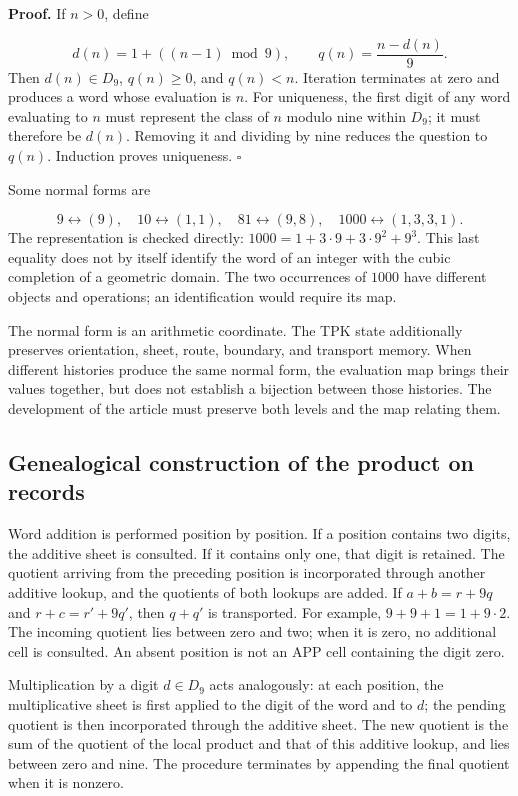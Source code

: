 \textbf{Proof.} If $n>0$, define

\[
d(n)=1+((n-1)\bmod9),\qquad q(n)=\frac{n-d(n)}9.
\]
Then $d(n)\in D_9$, $q(n)\ge0$, and $q(n)<n$. Iteration terminates at zero and produces a word whose evaluation is $n$. For uniqueness, the first digit of any word evaluating to $n$ must represent the class of $n$ modulo nine within $D_9$; it must therefore be $d(n)$. Removing it and dividing by nine reduces the question to $q(n)$. Induction proves uniqueness. \hfill\(\square\)

Some normal forms are

\[
9\leftrightarrow(9),\quad
10\leftrightarrow(1,1),\quad
81\leftrightarrow(9,8),\quad
1000\leftrightarrow(1,3,3,1).
\]
The representation is checked directly: $1000=1+3\cdot9+3\cdot9^2+9^3$. This last equality does not by itself identify the word of an integer with the cubic completion of a geometric domain. The two occurrences of $1000$ have different objects and operations; an identification would require its map.

The normal form is an arithmetic coordinate. The TPK state additionally preserves orientation, sheet, route, boundary, and transport memory. When different histories produce the same normal form, the evaluation map brings their values together, but does not establish a bijection between those histories. The development of the article must preserve both levels and the map relating them.

\subsection{Genealogical construction of the product on records}
Word addition is performed position by position. If a position contains two digits, the additive sheet is consulted. If it contains only one, that digit is retained. The quotient arriving from the preceding position is incorporated through another additive lookup, and the quotients of both lookups are added. If \(a+b=r+9q\) and \(r+c=r'+9q'\), then \(q+q'\) is transported. For example, \(9+9+1=1+9\cdot2\). The incoming quotient lies between zero and two; when it is zero, no additional cell is consulted. An absent position is not an APP cell containing the digit zero.

Multiplication by a digit $d\in D_9$ acts analogously: at each position, the multiplicative sheet is first applied to the digit of the word and to $d$; the pending quotient is then incorporated through the additive sheet. The new quotient is the sum of the quotient of the local product and that of this additive lookup, and lies between zero and nine. The procedure terminates by appending the final quotient when it is nonzero.

